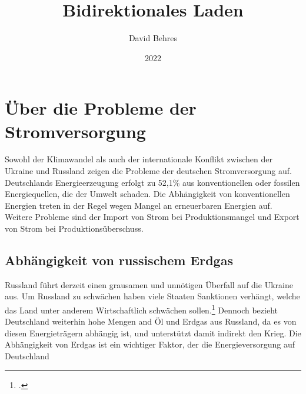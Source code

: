 \documentclass[12pt]{article}
\title{Bidirektionales Laden}
\author{David Behres}
\date{2022}
\begin{document}
    \tableofcontents


    \section{Über die Probleme der Stromversorgung}
        Sowohl der Klimawandel als auch der internationale Konflikt zwischen der Ukraine und Russland
        zeigen die Probleme der deutschen Stromversorgung auf.
        Deutschlands Energieerzeugung erfolgt zu 52,1\% aus konventionellen oder fossilen Energiequellen, die der Umwelt
        schaden.
        Die Abhängigkeit von konventionellen Energien treten in der Regel wegen Mangel an erneuerbaren Energien auf.
        Weitere Probleme sind der Import von Strom bei Produktionsmangel und Export von Strom bei Produktionsüberschuss.

        \subsection{Abhängigkeit von russischem Erdgas}
            Russland führt derzeit einen grausamen und unnötigen Überfall auf die Ukraine aus.
            Um Russland zu schwächen haben viele Staaten Sanktionen verhängt, welche das Land unter anderem
            Wirtschaftlich
            schwächen sollen.\footcite{sanktion}
            Dennoch bezieht Deutschland weiterhin hohe Mengen and Öl und Erdgas aus Russland, da es von diesen
            Energieträgern abhängig ist, und unterstützt damit indirekt den Krieg.
            Die Abhängigkeit von Erdgas ist ein wichtiger Faktor, der die Energieversorgung auf Deutschland
\end{document}
